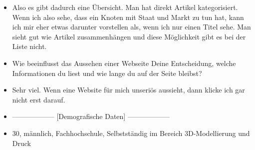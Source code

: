 {\begin{itemize}[]
            \item {} Also es gibt dadurch eine Übersicht.
                  Man hat direkt Artikel kategorisiert.
                  Wenn ich also sehe, dass ein Knoten mit Staat und Markt zu tun hat, kann ich mir eher etwas darunter vorstellen als, wenn ich nur einen Titel sehe.
                  Man sieht gut wie Artikel zusammenhängen und diese Möglichkeit gibt es bei der Liste nicht.
            \item {} Wie beeinflusst das Aussehen einer Webseite Deine Entscheidung, welche Informationen du liest und wie lange du auf der Seite bleibst?
            \item {} Sehr viel.
                  Wenn eine Website für mich unseriös aussieht, dann klicke ich gar nicht erst darauf.
            \item {------------------} [Demografische Daten] {------------------}
            \item {} 30, männlich, Fachhochschule, Selbstständig im Bereich 3D-Modellierung und Druck
      \end{itemize}}
\nolinenumbers
